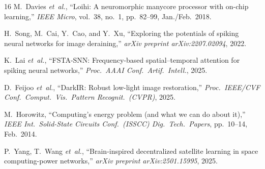 \documentclass[conference]{IEEEtran}
\begin{document}
\begin{thebibliography}{16}
M.~Davies \emph{et~al.},
``Loihi: A neuromorphic manycore processor with on-chip learning,''
\emph{IEEE Micro}, vol.~38, no.~1, pp.~82--99, Jan./Feb.\ 2018.

H.~Song, M.~Cai, Y.~Cao, and Y.~Xu,
``Exploring the potentials of spiking neural networks for image
deraining,''
\emph{arXiv preprint arXiv:2207.02094}, 2022.

K.~Lai \emph{et~al.},
``FSTA-SNN: Frequency-based spatial--temporal attention for spiking
neural networks,''
\emph{Proc.\ AAAI Conf.\ Artif.\ Intell.}, 2025.

D.~Feijoo \emph{et~al.},
``DarkIR: Robust low-light image restoration,''
\emph{Proc.\ IEEE/CVF Conf.\ Comput.\ Vis.\ Pattern Recognit.\
(CVPR)}, 2025.

M.~Horowitz,
``Computing's energy problem (and what we can do about it),''
\emph{IEEE Int.\ Solid-State Circuits Conf.\ (ISSCC) Dig.\ Tech.\
Papers}, pp.~10--14, Feb.\ 2014.

P.~Yang, T.~Wang \emph{et~al.},
``Brain-inspired decentralized satellite learning in space
computing-power networks,''
\emph{arXiv preprint arXiv:2501.15995}, 2025.

\end{thebibliography}
\end{document}
